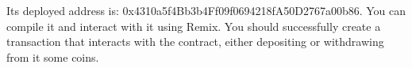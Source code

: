 \documentclass[12pt,addpoints,answers]{exam}
\begin{document}
\begin{questions}
 Its deployed address is: 0x4310a5f4Bb3b4Ff09f0694218fA50D2767a00b86. You can compile it and interact with it using Remix. You should successfully create a transaction that interacts with the contract, either depositing or withdrawing from it some coins. 
 

\newpage

~\\

\end{questions}
\end{document}
